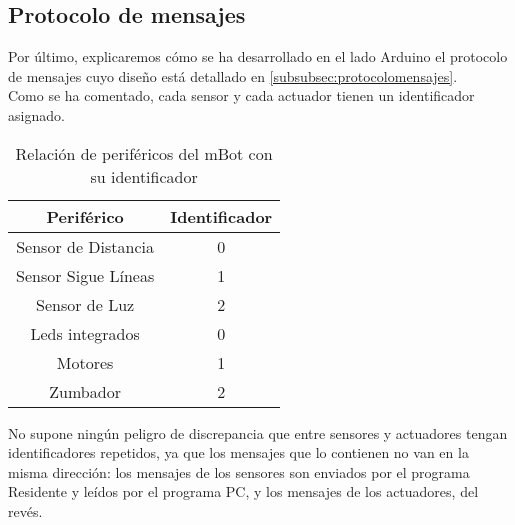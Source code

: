 \subsection{Protocolo de mensajes}\label{subsec:mensajesArduino}

Por último, explicaremos cómo se ha desarrollado en el lado Arduino el protocolo de mensajes cuyo diseño está detallado en  \ref{subsubsec:protocolomensajes}. \\
Como se ha comentado, cada sensor y cada actuador tienen un identificador asignado.
\begin{table}[h]
	\centering
	\begin{tabular}{ c | c }
		Periférico & Identificador \\
		\hline			
		Sensor de Distancia &  0\\
		Sensor Sigue Líneas & 1 \\
		Sensor de Luz & 2\\
		\hline
		Leds integrados & 0\\
		Motores & 1\\
		Zumbador & 2 \\

	\end{tabular}
\caption{Relación de periféricos del mBot con su identificador}
\label{table:identificadoresperifericos}
\end{table}
No supone ningún peligro de discrepancia que entre sensores y actuadores tengan identificadores repetidos, ya que los mensajes que lo contienen no van en la misma dirección: los mensajes de los sensores son enviados por el programa Residente y leídos por el programa PC, y los mensajes de los actuadores, del revés.\\

